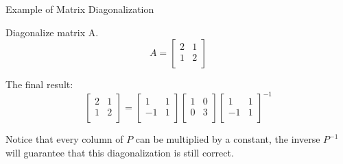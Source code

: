 \documentclass{beamer}
\begin{document}
        \begin{frame}{Example of Matrix Diagonalization}
            \begin{examples}
                Diagonalize matrix A.
                \begin{equation*}
                    A=\left[ \begin{matrix}
                    2&		1\\
                    1&		2\\
                \end{matrix} \right]
                \end{equation*}
                \end{examples}
        
        The final result:
            \begin{equation*}
                \left[ \begin{matrix}
                    2&		1\\
                    1&		2\\
                \end{matrix} \right] =\left[ \begin{matrix}
                    1&		1\\
                    -1&		1\\
                \end{matrix} \right] \left[ \begin{matrix}
                    1&		0\\
                    0&		3\\
                \end{matrix} \right] \left[ \begin{matrix}
                    1&		1\\
                    -1&		1\\
                \end{matrix} \right] ^{-1}
            \end{equation*}
        
        Notice that every column of $P$ can be multiplied by a constant, the inverse $P^{-1}$ will guarantee that this diagonalization is still correct.
        \end{frame}
        
\end{document}
